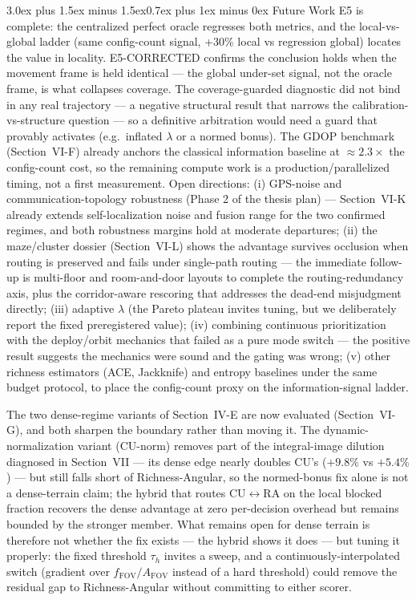 \documentclass[journal]{IEEEtran}
\makeatletter
\newcommand{\RA}{Richness-Angular}
\newcommand{\fcnt}{f_{\mathrm{FOV}}}
\newcommand{\farea}{A_{\mathrm{FOV}}}
\renewcommand{\section}{\@startsection{section}{1}{\z@}%
{3.0ex plus 1.5ex minus 1.5ex}{0.7ex plus 1ex minus 0ex}%
{\normalfont\large\bfseries\scshape\centering}}
\makeatother
\begin{document}
\section{Future Work}
E5 is complete: the centralized perfect oracle regresses both metrics, and the
local-vs-global ladder (same config-count signal, +30\% local vs regression
global) locates the value in locality. E5-CORRECTED confirms the conclusion
holds when the movement frame is held identical --- the global under-set
signal, not the oracle frame, is what collapses coverage. The coverage-guarded
diagnostic did not bind in any real trajectory --- a negative structural result
that narrows the calibration-vs-structure question --- so a definitive
arbitration would need a guard that provably activates (e.g.\ inflated
$\lambda$ or a normed bonus). The GDOP benchmark (Section~VI-F) already anchors
the classical information baseline at $\approx 2.3\times$ the config-count cost,
so the remaining compute work is a production/parallelized timing, not a first
measurement. Open directions: (i) GPS-noise and
communication-topology robustness (Phase 2 of the thesis plan) ---
Section~VI-K already extends self-localization noise and fusion range for the
two confirmed regimes, and both robustness margins hold at moderate departures;
(ii) the maze/cluster dossier (Section~VI-L) shows the advantage survives
occlusion when routing is preserved and fails under single-path routing ---
the immediate follow-up is multi-floor and room-and-door layouts to complete
the routing-redundancy axis, plus the corridor-aware rescoring that addresses
the dead-end misjudgment directly; (iii) adaptive $\lambda$
(the Pareto plateau invites tuning, but we deliberately report the fixed
preregistered value); (iv) combining continuous prioritization with the
deploy/orbit mechanics that failed as a pure mode switch --- the positive
result suggests the mechanics were sound and the gating was wrong; (v) other
richness estimators (ACE, Jackknife) and entropy baselines under the same
budget protocol, to place the config-count proxy on the information-signal
ladder.

The two dense-regime variants of Section~IV-E are now evaluated (Section~VI-G),
and both sharpen the boundary rather than moving it. The
dynamic-normalization variant (CU-norm) removes part of the integral-image
dilution diagnosed in Section~VII --- its dense edge nearly doubles CU's
($+9.8\%$ vs $+5.4\%$) --- but still falls short of \RA{}, so the normed-bonus
fix alone is not a dense-terrain claim; the hybrid that routes
CU$\leftrightarrow$RA on the local blocked fraction recovers the dense
advantage at zero per-decision overhead but remains bounded by the stronger
member. What remains open for dense terrain is therefore not whether the fix
exists --- the hybrid shows it does --- but tuning it properly: the fixed
threshold $\tau_h$ invites a sweep, and a continuously-interpolated switch
(gradient over $\fcnt/\farea$ instead of a hard threshold) could remove the
residual gap to \RA{} without committing to either scorer.
\end{document}
